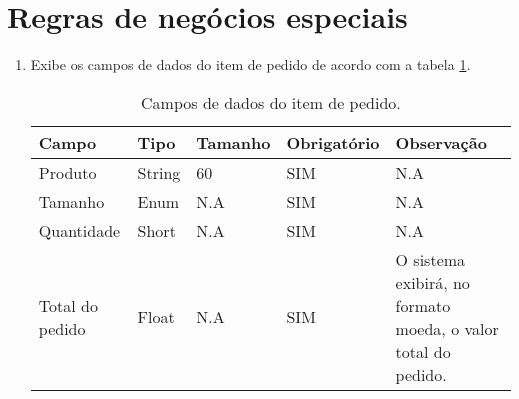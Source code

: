 \section{Regras de negócios especiais}

\begin{enumerate}[label=RN\arabic*]
	\item Exibe os campos de dados do item de pedido de acordo com a tabela \ref{uc007_tb_rn1}. \label{uc007_rn:1}
	\begin{table}[htb]
		\ABNTEXfontereduzida
		\caption[Campos de dados do item de pedido]{Campos de dados do item de pedido.}
		\label{uc007_tb_rn1}
		\begin{tabular}{|p{3.0cm}|p{2.0cm}|p{1.5cm}|p{2.0cm}|p{5.75cm}|}
			\hline
			\textbf{Campo}  & \textbf{Tipo} & \textbf{Tamanho} & \textbf{Obrigatório} & \textbf{Observação}                                           \\ \hline
			Produto         & String        & 60               & SIM                  & N.A                                                           \\ \hline
			Tamanho         & Enum          & N.A              & SIM                  & N.A                                                           \\ \hline
			Quantidade      & Short         & N.A              & SIM                  & N.A                                                           \\ \hline
			Total do pedido & Float         & N.A              & SIM                  & O sistema exibirá, no formato moeda, o valor total do pedido. \\ \hline
		\end{tabular}
	\end{table}
\end{enumerate}